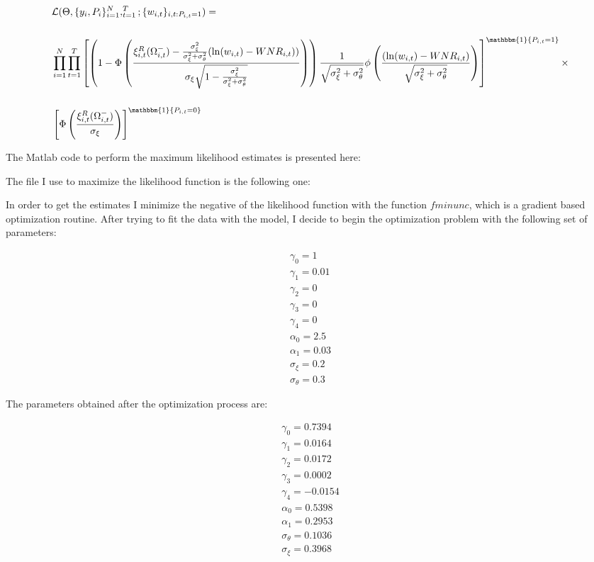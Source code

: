 \documentclass[11pt]{article}
\begin{document}
\begin{footnotesize}
\begin{align}
	& \mathcal{L}(\Theta, \{y_i,P_i\}_{i=1}^N,_{t=1}^T;\{w_{i,t}\}_{i,t:P_{i,t}=1})=\nonumber \\[0.2in]
	& \prod_{i=1}^N\prod_{t=1}^T\left[ \left(1-\Phi\left( \frac{\xi_{i,t}^R(\Omega_{i,t}^-)- \frac{\sigma_\xi^2}{\sigma_\xi^2+\sigma_\theta^2}(\ln(w_{i,t})-WNR_{i,t}))}{\sigma_\xi\sqrt{1-\frac{\sigma_\xi^2}{\sigma_\xi^2+\sigma_\theta^2}}}\right)  \right)\frac{1}{\sqrt{\sigma_\xi^2+\sigma_\theta^2}}\phi\left(\frac{(\ln(w_{i,t})-WNR_{i,t})}{\sqrt{\sigma_\xi^2+\sigma_\theta^2}} \right)\right]^{\mathbbm{1}\{P_{i,t}=1\}} \times \nonumber \\[0.2in]
	& \left[\Phi\left(\frac{ \xi_{i,t}^R(\Omega_{i,t}^-)}{\sigma_\xi} \right)\right]^{\mathbbm{1}\{P_{i,t}=0\}} 
\end{align}
\end{footnotesize}


The Matlab code to perform the maximum likelihood estimates is presented here:

The file I use to maximize the likelihood function is the following one:


In order to get the estimates I minimize the negative of the likelihood function with the function $fminunc$, which is a gradient based optimization routine. After trying to fit the data with the model, I decide to begin the optimization problem with the following set of parameters:

\begin{align}
	\gamma_0=1 \nonumber \\ 
	\gamma_1=0.01 \nonumber \\ 
	\gamma_2=0 \nonumber \\ 
	\gamma_3=0 \nonumber \\ 
	\gamma_4=0 \nonumber \\ 
		\alpha_0=2.5 \nonumber \\ 
	\alpha_1=0.03\nonumber \\ 
	\sigma_\xi=0.2 \nonumber \\ 
	\sigma_\theta=0.3 
\end{align}

The parameters obtained after the optimization process are:

\begin{align}
	\gamma_0=0.7394 \nonumber \\ 
	\gamma_1=0.0164 \nonumber \\ 
	\gamma_2=0.0172 \nonumber \\ 
	\gamma_3=0.0002 \nonumber \\ 
	\gamma_4=-0.0154 \nonumber \\ 
		\alpha_0=0.5398 \nonumber \\ 
	\alpha_1=0.2953\nonumber \\ 
	\sigma_\theta=0.1036 \nonumber \\ 
	\sigma_\xi=0.3968 
\end{align}
\end{document}
